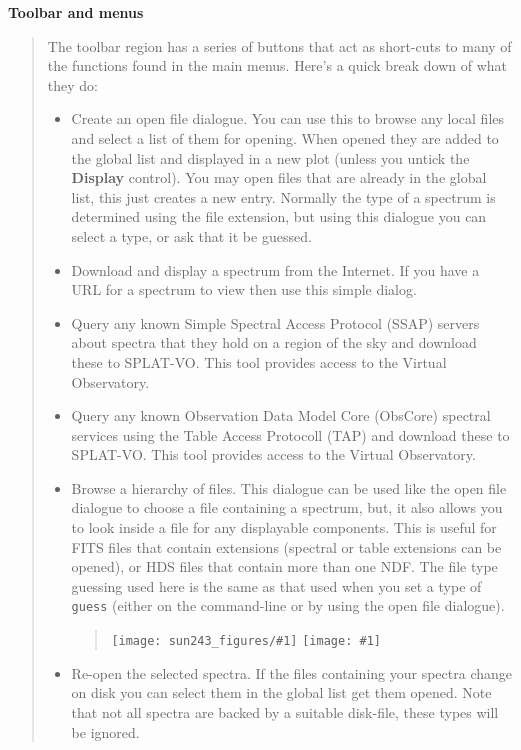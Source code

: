 \documentclass[twoside,11pt,nolof]{starlink}
\providecommand{\SPLAT}{\textsf{SPLAT-VO}}
\providecommand{\clippedmainfigure}[1]
{\begin{quote}
    \ifpdf
    \texttt{[image: sun243\_figures/\#1]}
    \else
    \texttt{[image: \#1]}
    \fi
 \end{quote}
}
\providecommand{\inline}[1]
        {\ifpdf
          \texttt{[image: sun243\_figures/\#1]}
          \else
          \texttt{[image: \#1]}
          \fi
        }
\newcommand{\labelitem}[1]{\textbf{#1}}
\providecommand{\hitext}[1]{\texttt{#1}}
\providecommand{\subheading}[1]{\textbf{\large{#1}}}
\begin{document}
\subheading{Toolbar and menus}
\begin{quote}
 The toolbar region has a series of buttons that act as short-cuts to
 many of the functions found in the main menus. Here's a quick break
 down of what they do:
 \begin{itemize}

  \item[\inline{openfile}] Create an open file dialogue. You can use this
  to browse any local files and select a list of them for opening. When
  opened they are added to the global list and displayed in a new plot
  (unless you untick the \labelitem{Display} control). You may open files
  that are already in the global list, this just creates a new entry.
  Normally the type of a spectrum is determined using the file extension,
  but using this dialogue you can select a type, or ask that it be guessed.

  \item[\inline{location}] Download and display a spectrum from the Internet.
  If you have a URL for a spectrum to view then use this simple dialog.

  \item[\inline{ssap}] Query any known Simple Spectral Access Protocol (SSAP)
  servers about spectra that they hold on a region of the sky and download
  these to \SPLAT. This tool provides access to the Virtual Observatory.
  
   \item[\inline{obscore}] Query any known Observation Data Model Core (ObsCore)
  spectral services using the Table Access Protocoll (TAP)  and download
  these to \SPLAT. This tool provides access to the Virtual Observatory.

  \item[\inline{browse}] Browse a hierarchy of files. This dialogue can be used
  like the open file dialogue to choose a file containing a spectrum, but,
  it also allows you to look inside a file for any displayable components.
  This is useful for FITS files that contain extensions (spectral or table
  extensions can be opened), or HDS files that contain more than one NDF.
  The file type guessing used here is the same as that used when you set
  a type of \hitext{guess} (either on the command-line or by using the
  open file dialogue).

  \clippedmainfigure{treeview}

  \item[\inline{reopen}] Re-open the selected spectra. If the files containing
  your spectra change on disk you can select them in the global list get them
  opened. Note that not all spectra are backed by a suitable disk-file, these
  types will be ignored.


\end{itemize}
\end{quote}
\end{document}
